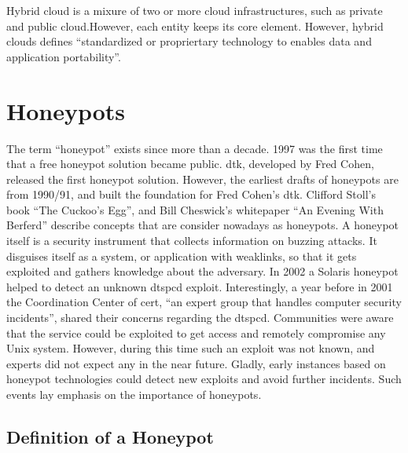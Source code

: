 Hybrid cloud is a mixure of two or more cloud infrastructures, such as private and public cloud.However, each entity keeps its core element. However, hybrid clouds defines \enquote{standardized or propriertary technology to enables data and application portability}\cite{Mell2011}.

\section{Honeypots}

The term \enquote{honeypot} exists since more than a decade. 1997 was the first time that a free honeypot solution became public. \ac{dtk}, developed by Fred Cohen, released the first honeypot solution. However, the earliest drafts of honeypots are from 1990/91, and built the foundation for Fred Cohen's \ac*{dtk}. Clifford Stoll's book \enquote{The Cuckoo's Egg}\cite{stroll2000}, and Bill Cheswick's whitepaper \enquote{An Evening With Berferd}\cite{Cheswick92} describe concepts that are consider nowadays as honeypots.\cite{Spitzner2003} A honeypot itself is a security instrument that collects information on buzzing attacks. It disguises itself as a system, or application with weaklinks, so that it gets exploited and gathers knowledge about the adversary. In 2002 a Solaris honeypot helped to detect an unknown dtspcd exploit. Interestingly, a year before in 2001 the Coordination Center of \ac{cert}, \enquote{an expert group that handles computer security incidents}, shared their concerns regarding the dtspcd. Communities were aware that the service could be exploited to get access and remotely compromise any Unix system. However, during this time such an exploit was not known, and experts did not expect any in the near future. Gladly, early instances based on honeypot technologies could detect new exploits and avoid further incidents. Such events lay emphasis on the importance of honeypots.

\subsection{Definition of a Honeypot}

